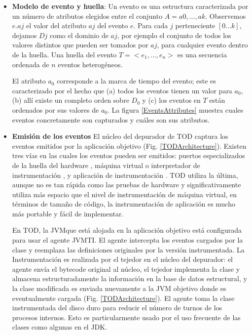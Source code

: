 \documentclass[12pt,legalpaper]{report}
\begin{document}
\begin{itemize}

	\item \textbf{Modelo de evento y huella}: Un evento es una estructura caracterizada por un número de atributos elegidos entre el conjunto $A={a0,...,ak}$. Observemos $e.aj$ el valor del atributo $aj$ del evento $e$.  Para cada $j$ perteneciente $[0...k]$, dejamos $Dj$ como el dominio de $aj$, por ejemplo el conjunto de todos los valores distintos que pueden ser tomados por $aj$, para cualquier evento dentro de la huella.  Una huella del evento $T=<e_{1},...,e_{n}>$ es una secuencia ordenada de $n$ eventos heterogéneos.

El atributo $a_{0}$ corresponde a la marca de tiempo del evento; este es caracterizado por el hecho que (a) todos los eventos tienen un valor para $a_{0}$, (b) allí existe un completo orden sobre $D_{0}$ y (c) los eventos en $T$ están ordenados por sus valores de $a_{0}$. La figura \ref{EventsAttributes} muestra cuales eventos concretamente son capturados y cuáles son sus atributos.

	\item \textbf{Emisión de los eventos} El núcleo del depurador de TOD captura los eventos emitidos por la aplicación objetivo (Fig. \ref{TODArchitecture}).  Existen tres vías en las cuales los eventos pueden ser emitidos:  puertos especializados de la huella del hardware \cite{rtmdt},  máquina virtual o interpretador de instrumentación \cite{rooi}, y aplicación de instrumentación \cite{zstep,odb}.  TOD utiliza la última, aunque no es tan rápida como las pruebas de hardware y significativamente utiliza más espacio que el nivel de instrumentación de máquina virtual, en términos de tamaño de código, la instrumentación de aplicación es mucho más portable y fácil de implementar.

En TOD, la JVM\footnotemark[1] que está alojada en la aplicación objetivo está configurada para usar el agente  JVMTI\footnotemark[2] .  El agente intercepta los eventos cargados por la clase y reemplaza las definiciones originales por la versión instrumentada.  La Instrumentación es realizada por el tejedor en el núcleo del depurador:  el agente envía el bytecode original al núcleo,  el tejedor implementa la clase y almacena estructuradamente la información en la base de datos estructural, y la clase modificada es enviada nuevamente a la JVM objetivo donde es eventualmente cargada (Fig. \ref{TODArchitecture}).  El agente toma la clase instrumentada del disco duro para reducir el número de turnos de los procesos internos.  Esto es  particularmente usado por el uso frecuente de las clases como algunas en el JDK.


\end{itemize}
\end{document}
